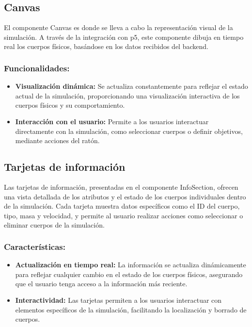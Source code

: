 \subsection{Canvas}
El componente Canvas es donde se lleva a cabo la representación visual de la simulación. A través de la integración con p5, este componente dibuja en tiempo real los cuerpos físicos, basándose en los datos recibidos del backend.
\subsubsection{Funcionalidades:}
\begin{itemize}
    \item \textbf{Visualización dinámica:} Se actualiza constantemente para reflejar el estado actual de la simulación, proporcionando una visualización interactiva de los cuerpos físicos y su comportamiento.
    \item \textbf{Interacción con el usuario:} Permite a los usuarios interactuar directamente con la simulación, como seleccionar cuerpos o definir objetivos, mediante acciones del ratón.
\end{itemize}
\subsection{Tarjetas de información}
Las tarjetas de información, presentadas en el componente InfoSection, ofrecen una vista detallada de los atributos y el estado de los cuerpos individuales dentro de la simulación. Cada tarjeta muestra datos específicos como el ID del cuerpo, tipo, masa y velocidad, y permite al usuario realizar acciones como seleccionar o eliminar cuerpos de la simulación.
\subsubsection{Características:}
\begin{itemize}
    \item \textbf{Actualización en tiempo real:} La información se actualiza dinámicamente para reflejar cualquier cambio en el estado de los cuerpos físicos, asegurando que el usuario tenga acceso a la información más reciente.
    \item \textbf{Interactividad:} Las tarjetas permiten a los usuarios interactuar con elementos específicos de la simulación, facilitando la localización y borrado de cuerpos.
\end{itemize}